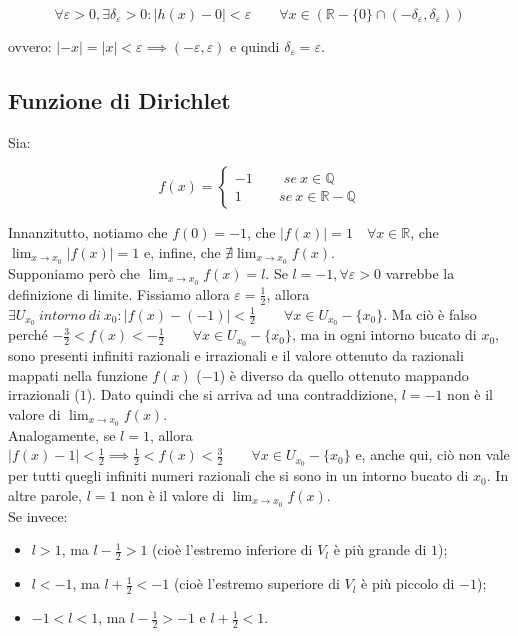 \documentclass{article}
\begin{document}
\begin{equation*}
    \forall \varepsilon > 0, \exists \delta_\varepsilon > 0 : |h(x) - 0| < \varepsilon \qquad \forall x \in (\mathbb{R} - \{0\} \cap (-\delta_\varepsilon, \delta_\varepsilon))
\end{equation*}

\noindent ovvero: $|-x| = |x| < \varepsilon \implies (-\varepsilon, \varepsilon)$ e quindi $\delta_\varepsilon = \varepsilon$.\\

\subsection{Funzione di Dirichlet}
Sia:

\begin{equation*}
    f(x) = 
    \begin{cases}
        -1 \qquad \ se \ x \in \mathbb{Q} \\
        1 \qquad \ \ \ se \ x \in \mathbb{R - Q}
    \end{cases}
\end{equation*}

\noindent Innanzitutto, notiamo che $f(0) = -1$, che $|f(x)| = 1 \quad \forall x \in \mathbb{R}$, che $\lim_{x \to x_0} |f(x)| = 1$ e, infine, che $\nexists \lim_{x \to x_0} f(x)$.\\
Supponiamo però che $\lim_{x \to x_0} f(x) = l$. Se $l = -1, \forall \varepsilon > 0$ varrebbe la definizione di limite. Fissiamo allora $\varepsilon = \frac{1}{2}$, allora $\exists U_{x_0} \ intorno \ di \ x_0 : |f(x) - (-1)| < \frac{1}{2} \qquad \forall x \in U_{x_0} - \{x_0\}$. Ma ciò è falso perché $-\frac{3}{2} < f(x) < -\frac{1}{2} \qquad \forall x \in U_{x_0} - \{x_0\}$, ma in ogni intorno bucato di $x_0$, sono presenti infiniti razionali e irrazionali e il valore ottenuto da razionali mappati nella funzione $f(x)$ ($-1$) è diverso da quello ottenuto mappando irrazionali ($1$). Dato quindi che si arriva ad una contraddizione, $l = -1$ non è il valore di $\lim_{x \to x_0} f(x)$.\\
Analogamente, se $l = 1$, allora $|f(x) - 1| < \frac{1}{2} \implies \frac{1}{2} < f(x) < \frac{3}{2} \qquad \forall x \in U_{x_0} - \{x_0\}$ e, anche qui, ciò non vale per tutti quegli infiniti numeri razionali che si sono in un intorno bucato di $x_0$. In altre parole, $l = 1$ non è il valore di $\lim_{x \to x_0} f(x)$.\\
Se invece:

\begin{itemize}
    \item $l > 1$, ma $l - \frac{1}{2} > 1$ (cioè l'estremo inferiore di $V_l$ è più grande di $1$);
    \item $l < -1$, ma $l + \frac{1}{2} < -1$ (cioè l'estremo superiore di $V_l$ è più piccolo di $-1$);
    \item $-1 < l < 1$, ma $l - \frac{1}{2} > - 1$ e $l + \frac{1}{2} < 1$.
\end{itemize}
\end{document}

